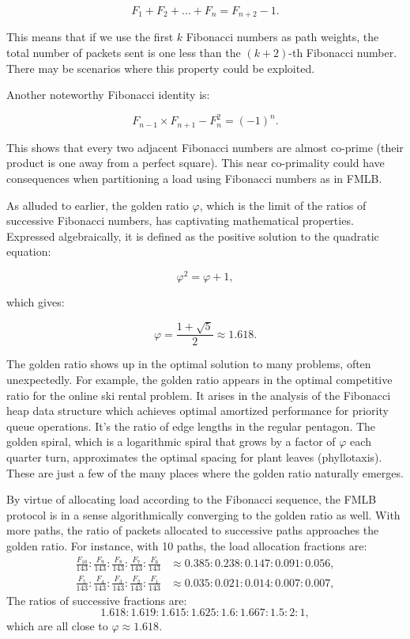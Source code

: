 \documentclass[12pt]{article}
\begin{document}
\begin{equation}
F_1 + F_2 + \ldots + F_n = F_{n+2} - 1.
\end{equation}

This means that if we use the first $k$ Fibonacci numbers as path weights, the total number of packets sent is one less than the $(k+2)$-th Fibonacci number. There may be scenarios where this property could be exploited.

Another noteworthy Fibonacci identity is:

\begin{equation}
F_{n-1} \times F_{n+1} - F_n^2 = (-1)^n.
\end{equation}

This shows that every two adjacent Fibonacci numbers are almost co-prime (their product is one away from a perfect square). This near co-primality could have consequences when partitioning a load using Fibonacci numbers as in FMLB.

As alluded to earlier, the golden ratio $\varphi$, which is the limit of the ratios of successive Fibonacci numbers, has captivating mathematical properties. Expressed algebraically, it is defined as the positive solution to the quadratic equation:

\begin{equation}
\varphi^2 = \varphi + 1,
\end{equation}

which gives:

\begin{equation}
\varphi = \frac{1 + \sqrt{5}}{2} \approx 1.618.
\end{equation}

The golden ratio shows up in the optimal solution to many problems, often unexpectedly. For example, the golden ratio appears in the optimal competitive ratio for the online ski rental problem. It arises in the analysis of the Fibonacci heap data structure which achieves optimal amortized performance for priority queue operations. It's the ratio of edge lengths in the regular pentagon. The golden spiral, which is a logarithmic spiral that grows by a factor of $\varphi$ each quarter turn, approximates the optimal spacing for plant leaves (phyllotaxis). These are just a few of the many places where the golden ratio naturally emerges.

By virtue of allocating load according to the Fibonacci sequence, the FMLB protocol is in a sense algorithmically converging to the golden ratio as well. With more paths, the ratio of packets allocated to successive paths approaches the golden ratio. For instance, with 10 paths, the load allocation fractions are:
\[
\begin{aligned}
\frac{F_{10}}{143} : \frac{F_9}{143} : \frac{F_8}{143} : \frac{F_7}{143} : \frac{F_6}{143} &\approx 0.385 : 0.238 : 0.147 : 0.091 : 0.056, \\
\frac{F_5}{143} : \frac{F_4}{143} : \frac{F_3}{143} : \frac{F_2}{143} : \frac{F_1}{143} &\approx 0.035 : 0.021 : 0.014 : 0.007 : 0.007,
\end{aligned}
\]
The ratios of successive fractions are:
\[
1.618 : 1.619 : 1.615 : 1.625 : 1.6 : 1.667 : 1.5 : 2 : 1,
\]
which are all close to $\varphi \approx 1.618$.
\end{document}
